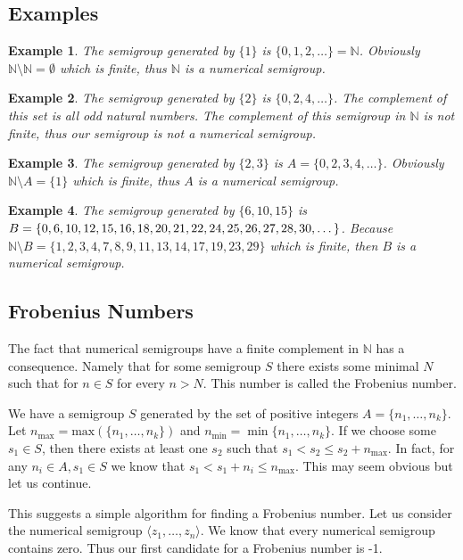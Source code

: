 \documentclass[11pt]{amsart}
\theoremstyle{plain}
\newtheorem{exa}{Example}
\theoremstyle{definition}
\begin{document}
\subsection{Examples}
\begin{exa}
  The semigroup generated by $\{1\}$ is $\{0,1,2,\dots \}=\mathbb{N}$. Obviously
  $\mathbb{N}\setminus \mathbb{N}=\emptyset$ which is finite, thus $\mathbb{N}$
  is a numerical semigroup.
\end{exa}
\begin{exa}
  The semigroup generated by $\{2\}$ is $\{0,2,4,\dots \}$. The complement of
  this set is all odd natural numbers. The complement of this semigroup in
  $\mathbb{N}$ is not finite, thus our semigroup is not a numerical semigroup.
\end{exa}
\begin{exa}
  The semigroup generated by $\{2,3\}$ is $A=\{0,2,3,4,\dots \}$. Obviously
  $\mathbb{N}\setminus A=\{1\}$ which is finite, thus $A$ is a numerical
  semigroup.
\end{exa}
\begin{exa}
  The semigroup generated by $\{6,10,15\}$ is $B=\{0, 6, 10, 12, 15, 16, 18,
  20, 21, 22,\\ 24, 25, 26, 27, 28, 30, \dots \}$. Because $\mathbb{N}\setminus
  B=\{1,2,3,4,7,8,9,11,13,
  14,17,19,23,29\}$ which is finite, then $B$ is a numerical semigroup.
\end{exa}
\subsection{Frobenius Numbers}
The fact that numerical semigroups have a finite complement in $\mathbb{N}$ has
a consequence. Namely that for some semigroup $S$ there exists some minimal $N$
such that for $n\in S$ for every  $n>N$. This number is called the Frobenius
number.

We have a semigroup $S$ generated by the set of positive integers
$A=\{ n_1,\dots,n_k\}$. Let $n_\text{max}=\text{max}(\{n_1,\dots,n_k\})$ and
$n_{\min{}}=\min{\{n_1,\dots,n_k\}}$. If we choose some $s_1\in S$, then
there exists at least one $s_2$ such that $s_1<s_2\le s_2+n_{\max{}}$. In
fact, for any $n_i\in A,s_1\in S$ we know that
$s_1<s_1+n_i\le n_\text{max}$. This may seem obvious but let us continue.

This suggests a simple algorithm for finding a Frobenius number. Let us consider the numerical semigroup $\langle z_1,\dots,z_n\rangle$. We know that every numerical semigroup contains zero. Thus our first candidate for a Frobenius number is -1.
\end{document}
